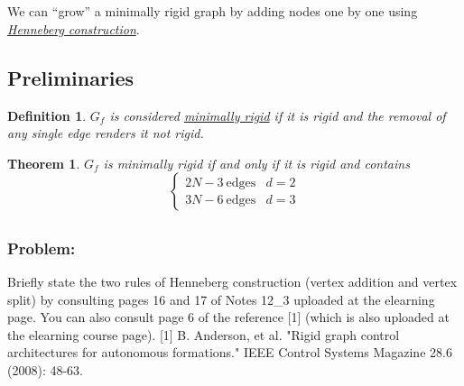 \documentclass[]{article}
\numberwithin{equation}{section}
\newtheorem{definition}{Definition}
\newtheorem{theorem}{Theorem}
\begin{document}
\newpage
\section{}
We can ``grow''  a minimally rigid graph by adding nodes one by one using \emph{\underline{Henneberg construction}}.
\subsection*{Preliminaries}
\begin{definition}
    $G_f$ is considered \emph{\underline{minimally rigid}} if it is rigid and the removal of any single edge renders it not rigid.
\end{definition}

\begin{theorem}
    $G_f$ is minimally rigid if and only if it is rigid and contains \[
        \begin{cases}
            2N - 3 \ \text{edges} & d=2\\
            3N - 6 \ \text{edges} & d=3
        \end{cases}
    \]
\end{theorem}

\subsection{}
\subsubsection*{Problem:}
Briefly state the two rules of Henneberg construction (vertex addition and vertex split) by consulting pages 16 and 17 of Notes 12\_3 uploaded at the elearning page. 
You  can  also  consult  page  6  of  the  reference  [1]  (which  is  also  uploaded  at  the elearning course page). 
[1] B. Anderson, et al. "Rigid graph control architectures for autonomous formations." IEEE Control Systems Magazine 28.6 (2008): 48-63.
\end{document}
